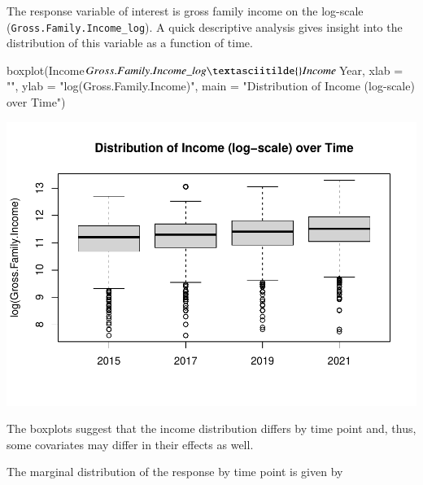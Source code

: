 \documentclass[a4paper, preprint, 3p,
authoryear]{elsarticle} %
\newenvironment{Shaded}{\begin{snugshade}}{\end{snugshade}}
\newcommand{\NormalTok}[1]{#1}
\newcommand{\pandocbounded}[1]{#1}
\begin{document}
The response variable of interest is gross family income on the
log-scale (\texttt{Gross.Family.Income\_log}). A quick descriptive
analysis gives insight into the distribution of this variable as a
function of time.

\begin{Shaded}
\begin{Highlighting}[]
\NormalTok{boxplot(Income$Gross.Family.Income\_log \textasciitilde{} Income$Year,}
\NormalTok{        xlab = "", ylab = "log(Gross.Family.Income)",}
\NormalTok{        main = "Distribution of Income (log{-}scale) over Time")}
\end{Highlighting}
\end{Shaded}

\pandocbounded{\includegraphics[keepaspectratio]{Vignette-for-panelTVP_files/figure-latex/unnamed-chunk-12-1.pdf}}

The boxplots suggest that the income distribution differs by time point
and, thus, some covariates may differ in their effects as well.

The marginal distribution of the response by time point is given by

\begin{Shaded}
\end{Shaded}
\end{document}
